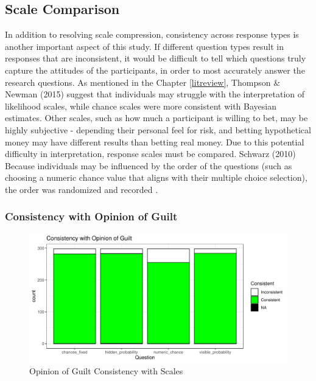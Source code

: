 \documentclass[print]{nuthesis}
\begin{document}
\hypertarget{scale-comparison}{%
\subsection{Scale Comparison}\label{scale-comparison}}

In addition to resolving scale compression, consistency across response types is another important aspect of this study.
If different question types result in responses that are inconsistent, it would be difficult to tell which questions truly capture the attitudes of the participants, in order to most accurately answer the research questions.
As mentioned in the Chapter \ref{litreview}, Thompson \& Newman (2015) suggest that individuals may struggle with the interpretation of likelihood scales, while chance scales were more consistent with Bayesian estimates.
Other scales, such as how much a participant is willing to bet, may be highly subjective - depending their personal feel for risk, and betting hypothetical money may have different results than betting real money.
Due to this potential difficulty in interpretation, response scales must be compared.
Schwarz (2010) 
Because individuals may be influenced by the order of the questions (such as choosing a numeric chance value that aligns with their multiple choice selection), the order was randomized and recorded .

\hypertarget{consistency-with-opinion-of-guilt}{%
\subsubsection{Consistency with Opinion of Guilt}\label{consistency-with-opinion-of-guilt}}

\begin{figure}

{\centering \includegraphics[width=\linewidth]{thesis_files/figure-latex/opinioncomp-1} 

}

\caption{Opinion of Guilt Consistency with Scales}\label{fig:opinioncomp}
\end{figure}
\end{document}
